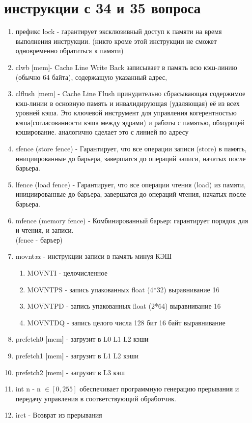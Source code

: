 \documentclass[a4paper,10pt]{article}
\begin{document}
\section*{инструкции с 34 и 35 вопроса}
\begin{enumerate}
    \item префикс lock - гарантирует эксклюзивный доступ к памяти на время выполнения инструкции. (никто кроме этой инструкции не сможет одновременно обратиться к памяти)
    \item clwb [mem]- Cache Line Write Back записывает в память всю кэш-линию (обычно 64 байта), содержащую указанный адрес, 
    \item clflush [mem] - Cache Line Flush принудительно сбрасывающая содержимое кэш-линии в основную память и инвалидирующая (удаляющая) её из всех уровней кэша. Это ключевой инструмент для управления когерентностью кэша(согласованности кэша между ядрами) и работы с памятью, обходящей кэширование. аналогично сделает это с линией по адресу
    \item sfence (store fence) - Гарантирует, что все операции записи (store) в память, инициированные до барьера, завершатся до операций записи, начатых после барьера.
    \item lfence (load fence) - Гарантирует, что все операции чтения (load) из памяти, инициированные до барьера, завершатся до операций чтения, начатых после барьера.
    \item mfence (memory fence) - Комбинированный барьер: гарантирует порядок для и чтения, и записи. \\
    (fence - барьер)
    \item movnt\textit{xx} - инструкции записи в память минуя КЭШ
    \begin{enumerate}
        \item MOVNTI - целочисленное
        \item MOVNTPS - запись упакованных float (4*32) выравнивание 16
        \item MOVNTPD - запись упакованных float (2*64) выравнивание 16
        \item MOVNTDQ - запись целого числа 128 бит 16 байт выравнивание
    \end{enumerate}
    \item prefetch0 [mem] - загрузит в L0 L1 L2 кэши 
    \item prefetch1 [mem] - загрузит в L1 L2 кэши
    \item prefetch2 [mem] - загрузит в L3 кэш
    \item int n - n $\in [0, 255]$  обеспечивает программную генерацию прерывания и передачу управления в соответствующий обработчик.
    \item iret - Возврат из прерывания
\end{enumerate}
\end{document}
